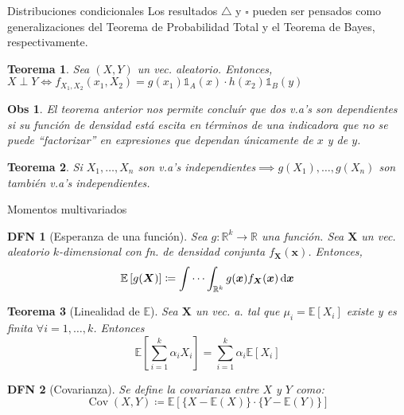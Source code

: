 \documentclass[a4paper]{article}
\newtheorem{definition}{DFN}
\theoremstyle{mytheoremstyle}
\newtheorem{theorem}{Teorema}
\newtheorem*{obs}{Obs}
\newcommand{\R}{\mathbb{R}}
\newcommand{\E}{\mathbb{E}}
\newcommand{\1}{\mathds{1}}
\DeclareMathOperator{\cov}{Cov}
\renewcommand{\vec}[1]{\boldsymbol{#1}}
\newcommand{\diff}[1]{\,\mathrm{d}#1}
\begin{document}
\begin{multicols*}{3}
\begin{roundbox}{Distribuciones condicionales}
Los resultados $\triangle$ y $\square$ pueden ser pensados como generalizaciones del Teorema de Probabilidad Total y el Teorema de Bayes, respectivamente. 

\begin{theorem}
    Sea $(X, Y)$ un vec. aleatorio.
    Entonces, $X \perp Y \iff f_{X_1, X_2} (x_1, X_2) = g(x_1) \1_{A}(x) \cdot h(x_2) \1_{B}(y)$
\end{theorem}

\begin{obs}
    El teorema anterior nos permite concluír que dos v.a's son dependientes si su función de densidad está escita en términos de una indicadora que no se puede ``factorizar'' en expresiones que dependan únicamente de $x$ y de $y$.
\end{obs}

\begin{theorem}
    Si $X_1, \dots , X_n$ son v.a's independientes$\implies g(X_1), \dots, g(X_n)$ son también v.a's independientes.
\end{theorem}
\end{roundbox}

\begin{roundbox}{Momentos multivariados}
\begin{definition}[Esperanza de una función]
    Sea $g: \R^{k} \to \R$ una función.
    Sea $\vec{X}$ un vec. aleatorio $k$-dimensional con fn. de densidad conjunta $f_{\vec{X}} (\vec{x})$.
    Entonces, 
    \begin{equation*}
        \E \left[ g(\vec{X}) \right] \coloneqq \idotsint_{\R^{k}} g(\vec{x}) f_{\vec{X}} (\vec{x}) \diff{\vec{x}}
    \end{equation*}
\end{definition}
\begin{theorem}[Linealidad de $\E$]
    Sea $\vec{X}$ un vec. a. tal que $\mu_i = \E[X_i]$ existe y es finita $\forall i = 1, \dots, k$. Entonces
    \begin{equation*}
    \E \left[ \sum_{i=1}^{k} \alpha_i X_i  \right] = \sum_{i=1}^{k} \alpha_i \E \left[ X_i \right]
    \end{equation*}
\end{theorem}

\begin{definition}[Covarianza]
    Se define la covarianza entre $X$ y $Y$ como:
    \begin{equation*}
        \cov(X,Y) \coloneqq \E \left[ \{ X - \E(X) \} \cdot \{ Y - \E(Y) \} \right]
    \end{equation*}
\end{definition}
\end{roundbox}



\end{multicols*}
\end{document}
